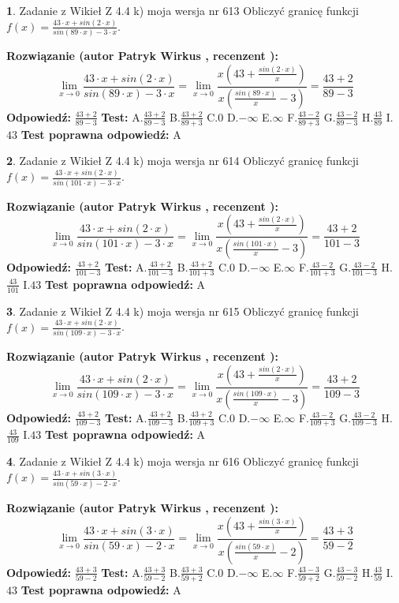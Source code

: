 \documentclass[12pt, a4paper]{article}
\theoremstyle{definition} %
\newtheorem{zad}{}
\newcommand{\zadStart}[1]{\begin{zad}#1\newline}
\newcommand{\zadStop}{\end{zad}}
\newcommand{\rozwStart}[2]{\noindent \textbf{Rozwiązanie (autor #1 , recenzent #2): }\newline}
\newcommand{\rozwStop}{\newline}
\newcommand{\odpStart}{\noindent \textbf{Odpowiedź:}\newline}
\newcommand{\odpStop}{\newline}
\newcommand{\testStart}{\noindent \textbf{Test:}\newline}
\newcommand{\testStop}{\newline}
\newcommand{\kluczStart}{\noindent \textbf{Test poprawna odpowiedź:}\newline}
\newcommand{\kluczStop}{\newline}
\begin{document}
\zadStart{Zadanie z Wikieł Z 4.4 k) moja wersja nr 613}
Obliczyć granicę funkcji $f(x)=\frac{43\cdot x +sin(2\cdot x)}{sin(89\cdot x) -3\cdot x}$.
\zadStop
\rozwStart{Patryk Wirkus}{}
$$\lim\limits_{x\to 0}\frac{43\cdot x +sin(2\cdot x)}{sin(89\cdot x) -3\cdot x}
=\lim\limits_{x\to 0}\frac{x(43+\frac{sin(2\cdot x)}{x})}{x(\frac{sin(89\cdot x)}{x}-3)}
=\frac{43+2}{89-3}$$
\rozwStop
\odpStart
$\frac{43+2}{89-3}$
\odpStop
\testStart
A.$\frac{43+2}{89-3}$
B.$\frac{43+2}{89+3}$
C.$0$
D.$-\infty$
E.$\infty$
F.$\frac{43-2}{89+3}$
G.$\frac{43-2}{89-3}$
H.$\frac{43}{89}$
I.$43$
\testStop
\kluczStart
A
\kluczStop



\zadStart{Zadanie z Wikieł Z 4.4 k) moja wersja nr 614}
Obliczyć granicę funkcji $f(x)=\frac{43\cdot x +sin(2\cdot x)}{sin(101\cdot x) -3\cdot x}$.
\zadStop
\rozwStart{Patryk Wirkus}{}
$$\lim\limits_{x\to 0}\frac{43\cdot x +sin(2\cdot x)}{sin(101\cdot x) -3\cdot x}
=\lim\limits_{x\to 0}\frac{x(43+\frac{sin(2\cdot x)}{x})}{x(\frac{sin(101\cdot x)}{x}-3)}
=\frac{43+2}{101-3}$$
\rozwStop
\odpStart
$\frac{43+2}{101-3}$
\odpStop
\testStart
A.$\frac{43+2}{101-3}$
B.$\frac{43+2}{101+3}$
C.$0$
D.$-\infty$
E.$\infty$
F.$\frac{43-2}{101+3}$
G.$\frac{43-2}{101-3}$
H.$\frac{43}{101}$
I.$43$
\testStop
\kluczStart
A
\kluczStop



\zadStart{Zadanie z Wikieł Z 4.4 k) moja wersja nr 615}
Obliczyć granicę funkcji $f(x)=\frac{43\cdot x +sin(2\cdot x)}{sin(109\cdot x) -3\cdot x}$.
\zadStop
\rozwStart{Patryk Wirkus}{}
$$\lim\limits_{x\to 0}\frac{43\cdot x +sin(2\cdot x)}{sin(109\cdot x) -3\cdot x}
=\lim\limits_{x\to 0}\frac{x(43+\frac{sin(2\cdot x)}{x})}{x(\frac{sin(109\cdot x)}{x}-3)}
=\frac{43+2}{109-3}$$
\rozwStop
\odpStart
$\frac{43+2}{109-3}$
\odpStop
\testStart
A.$\frac{43+2}{109-3}$
B.$\frac{43+2}{109+3}$
C.$0$
D.$-\infty$
E.$\infty$
F.$\frac{43-2}{109+3}$
G.$\frac{43-2}{109-3}$
H.$\frac{43}{109}$
I.$43$
\testStop
\kluczStart
A
\kluczStop



\zadStart{Zadanie z Wikieł Z 4.4 k) moja wersja nr 616}
Obliczyć granicę funkcji $f(x)=\frac{43\cdot x +sin(3\cdot x)}{sin(59\cdot x) -2\cdot x}$.
\zadStop
\rozwStart{Patryk Wirkus}{}
$$\lim\limits_{x\to 0}\frac{43\cdot x +sin(3\cdot x)}{sin(59\cdot x) -2\cdot x}
=\lim\limits_{x\to 0}\frac{x(43+\frac{sin(3\cdot x)}{x})}{x(\frac{sin(59\cdot x)}{x}-2)}
=\frac{43+3}{59-2}$$
\rozwStop
\odpStart
$\frac{43+3}{59-2}$
\odpStop
\testStart
A.$\frac{43+3}{59-2}$
B.$\frac{43+3}{59+2}$
C.$0$
D.$-\infty$
E.$\infty$
F.$\frac{43-3}{59+2}$
G.$\frac{43-3}{59-2}$
H.$\frac{43}{59}$
I.$43$
\testStop
\kluczStart
A
\kluczStop
\end{document}

